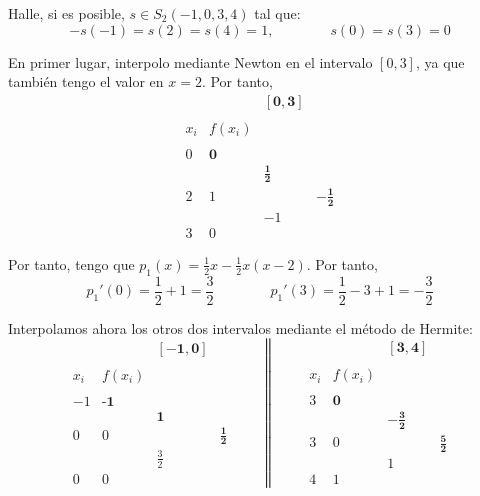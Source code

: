 \begin{ejercicio}
    Halle, si es posible, $s\in S_2(-1, 0, 3, 4)$ tal que:
    \begin{equation*}
        -s(-1)=s(2)=s(4)=1,\qquad \qquad s(0)=s(3)=0
    \end{equation*}


    En primer lugar, interpolo mediante Newton en el intervalo $[0,3]$, ya que también tengo el valor en $x=2$. Por tanto,
    \begin{equation*}
        \begin{array}{c|ccc}
            &&\mathbf{[0,3]} \\ \\
            x_i & f(x_i) \\ \\
            0 & \textbf{0} \\
            && \mathbf{\frac{1}{2}} \\ 
            2 & 1 && \mathbf{-\frac{1}{2}}\\
            && -1\\
            3 & 0
        \end{array}
    \end{equation*}

    Por tanto, tengo que $p_1(x)=\frac{1}{2}x -\frac{1}{2}x(x-2)$. Por tanto,
    \begin{equation*}
        p_1'(0)=\frac{1}{2}+1=\frac{3}{2}
        \qquad \qquad
        p_1'(3)=\frac{1}{2}-3+1 = -\frac{3}{2}
    \end{equation*}

    Interpolamos ahora los otros dos intervalos mediante el método de Hermite:
    \begin{equation*}
        \begin{array}{c|ccc}
            &&\mathbf{[-1,0]} \\ \\
            x_i & f(x_i) \\ \\
            -1 & \textbf{-1} \\
            && \textbf{1} \\ 
            0 & 0 && \mathbf{\frac{1}{2}}\\
            && \frac{3}{2}\\
            0 & 0
        \end{array}
        \qquad \left\|\qquad
        \begin{array}{c|ccc}
            &&\mathbf{[3,4]} \\ \\
            x_i & f(x_i) \\ \\
            3 & \textbf{0} \\
            && \mathbf{-\frac{3}{2}} \\ 
            3 & 0 && \mathbf{\frac{5}{2}}\\
            && 1\\
            4 & 1
        \end{array}\right.
    \end{equation*}


\end{ejercicio}
